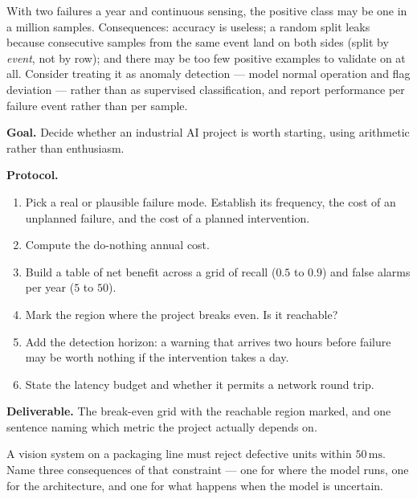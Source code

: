 \begin{cautionbox}
With two failures a year and continuous sensing, the positive class may be one
in a million samples. Consequences: accuracy is useless; a random split leaks
because consecutive samples from the same event land on both sides (split by
\emph{event}, not by row); and there may be too few positive examples to
validate on at all. Consider treating it as anomaly detection --- model normal
operation and flag deviation --- rather than as supervised classification, and
report performance per failure event rather than per sample.
\end{cautionbox}

\begin{practicallab}
\textbf{Goal.} Decide whether an industrial AI project is worth starting, using
arithmetic rather than enthusiasm.

\textbf{Protocol.}
\begin{enumerate}
  \item Pick a real or plausible failure mode. Establish its frequency, the
        cost of an unplanned failure, and the cost of a planned intervention.
  \item Compute the do-nothing annual cost.
  \item Build a table of net benefit across a grid of recall
        ($0.5$ to $0.9$) and false alarms per year ($5$ to $50$).
  \item Mark the region where the project breaks even. Is it reachable?
  \item Add the detection horizon: a warning that arrives two hours before
        failure may be worth nothing if the intervention takes a day.
  \item State the latency budget and whether it permits a network round trip.
\end{enumerate}

\textbf{Deliverable.} The break-even grid with the reachable region marked, and
one sentence naming which metric the project actually depends on.
\end{practicallab}

\begin{checkpoint}
A vision system on a packaging line must reject defective units within
$50\,\text{ms}$. Name three consequences of that constraint --- one for where
the model runs, one for the architecture, and one for what happens when the
model is uncertain.
\end{checkpoint}

